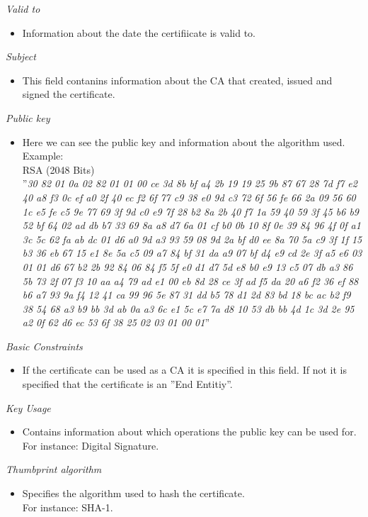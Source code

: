\emph{Valid to}
\begin{itemize}
	\item Information about the date the certifiicate is valid to.
\end{itemize}
\emph{Subject}
\begin{itemize}
	\item This field contanins information about the CA that created, issued and signed the certificate.
\end{itemize}
\emph{Public key}
\begin{itemize}
	\item Here we can see the public key and information about the algorithm used.\\
Example:\\
RSA (2048 Bits)\\
''\textit{30 82 01 0a 02 82 01 01 00 ce 3d 8b bf a4 2b 19 19 25 9b 87 67 28 7d f7 e2 40 a8 f3 0c ef a0 2f 40 ec f2 6f 77 c9 38 e0 9d c3 72 6f 56 fe 66 2a 09 56 60 1c e5 fe c5 9e 77 69 3f 9d c0 e9 7f 28 b2 8a 2b 40 f7 1a 59 40 59 3f 45 b6 b9 52 bf 64 02 ad db b7 33 69 8a a8 d7 6a 01 cf b0 0b 10 8f 0e 39 84 96 4f 0f a1 3c 5c 62 fa ab dc 01 d6 a0 9d a3 93 59 08 9d 2a bf d0 ee 8a 70 5a c9 3f 1f 15 b3 36 eb 67 15 e1 8e 5a c5 09 a7 84 bf 31 da a9 07 bf d4 e9 cd 2e 3f a5 e6 03 01 01 d6 67 b2 2b 92 84 06 84 f5 5f e0 d1 d7 5d e8 b0 e9 13 c5 07 db a3 86 5b 73 2f 07 f3 10 aa a4 79 ad e1 00 eb 8d 28 ce 3f ad f5 da 20 a6 f2 36 ef 88 b6 a7 93 9a f4 12 41 ca 99 96 5e 87 31 dd b5 78 d1 2d 83 bd 18 bc ac b2 f9 38 54 68 a3 b9 bb 3d ab 0a a3 6c e1 5c e7 7a d8 10 53 db bb 4d 1c 3d 2e 95 a2 0f 62 d6 ec 53 6f 38 25 02 03 01 00 01}''
\end{itemize}
\emph{Basic Constraints}
\begin{itemize}
	\item If the certificate can be used as a CA it is specified in this field. If not it is specified that the certificate is an ''End Entitiy''.
\end{itemize}
\emph{Key Usage}
\begin{itemize}
	\item Contains information about which operations the public key can be used for.\\
For instance: Digital Signature.
\end{itemize}
\emph{Thumbprint algorithm}
\begin{itemize}
	\item Specifies the algorithm used to hash the certificate.
\\For instance: SHA-1.
\end{itemize}
